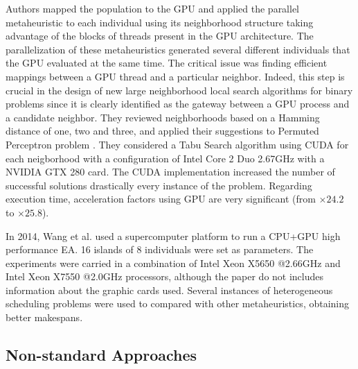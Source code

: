 \documentclass[review]{elsarticle}
\begin{document}
Authors mapped the population to the GPU and applied the parallel metaheuristic to each individual using its neighborhood structure taking advantage of the blocks of threads present in the GPU architecture. The parallelization of these metaheuristics generated several different individuals that the GPU evaluated at the same time. The critical issue was finding efficient mappings between a GPU thread and a particular neighbor. Indeed, this step is crucial in the design of new large neighborhood local search algorithms for binary problems since it is clearly identified as the gateway between a GPU process and a candidate neighbor. They reviewed neighborhoods based on a Hamming distance of one, two and three, and applied their suggestions to Permuted Perceptron problem \cite{KnudsenPermutedPerceptronProblem1999}. They considered a Tabu Search algorithm \cite{TaillardTabySearch1991} using CUDA for each neigborhood with a configuration of Intel Core 2 Duo 2.67GHz with a NVIDIA GTX 280 card. The CUDA implementation increased the number of successful solutions drastically every instance of the problem. Regarding execution time, acceleration factors using GPU are very significant (from $\times24.2$ to $\times25.8$).

In 2014, Wang et al. \cite{Wang14heterogeneous} used a supercomputer platform to run a CPU+GPU high performance EA. 16 islands of 8 individuals were set as parameters. The experiments were carried in a combination of Intel Xeon X5650 @2.66GHz and  Intel Xeon X7550 @2.0GHz processors, although the paper do not includes information about the graphic cards used. Several instances of heterogeneous scheduling problems were used to compared with other metaheuristics, obtaining better makespans. 


\subsection{Non-standard Approaches}
\end{document}
